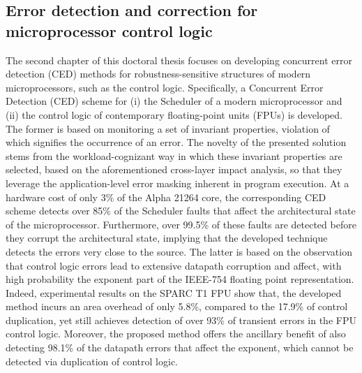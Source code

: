 \documentclass[12pt]{yalephd}
\begin{document}
\subsection{Error detection and correction for microprocessor control logic}
The second chapter of this doctoral thesis focuses on developing concurrent error detection (CED) methods for robustness-sensitive structures of modern microprocessors, such as the control logic. Specifically, a Concurrent Error Detection (CED) scheme for (i) the Scheduler of a modern microprocessor and (ii) the control logic of contemporary floating-point units (FPUs) is developed. The former is based on monitoring a set of invariant properties, violation of which signifies the occurrence of an error. The novelty of the presented solution stems from the workload-cognizant way in which these invariant properties are selected, based on the aforementioned cross-layer impact analysis, so that they leverage the application-level error masking inherent in program execution. At a hardware cost of only 3\% of the Alpha 21264 core, the corresponding CED scheme detects over 85\% of the Scheduler faults that affect the architectural state of the microprocessor. Furthermore, over 99.5\% of these faults are detected before they corrupt the architectural state, implying that the developed technique detects the errors very close to the source. The latter is based on the observation that control logic errors lead to extensive datapath corruption and affect, with high probability the exponent part of the IEEE-754 floating point representation. Indeed, experimental results on the SPARC T1 FPU show that, the developed method incurs an area overhead of only 5.8\%, compared to the 17.9\% of control duplication, yet still achieves detection of over 93\% of transient errors in the FPU control logic. Moreover, the proposed method offers the ancillary benefit of also detecting 98.1\% of the datapath errors that affect the exponent, which cannot be detected via duplication of control logic.
\end{document}
